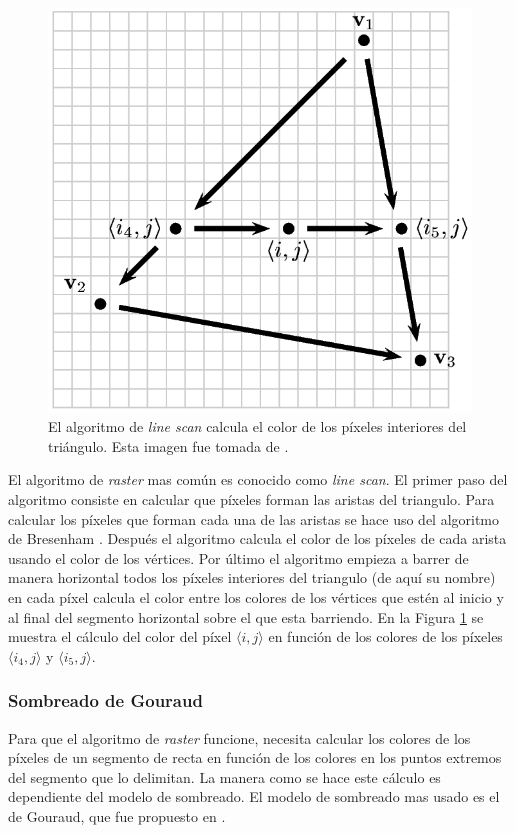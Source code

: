 \begin{figure}[htp]
 \centering
  \includegraphics[scale=0.4]{img/cap01/lineScan}
  \caption[Ejemplo de sombreado sobre un triangulo]{El algoritmo de \emph{line scan} calcula el color de los píxeles interiores del triángulo. Esta imagen fue tomada de \cite{bussCG}.}
  \label{fig:lineScan}
\end{figure}

El algoritmo de \emph{raster} mas común es conocido como \emph{line scan}. El primer paso del algoritmo consiste en calcular que píxeles forman las aristas del triangulo. Para calcular los píxeles que forman cada una de las aristas se hace uso del algoritmo de Bresenham \cite{bresenhamAlgorithm}. Después el algoritmo calcula el color de los píxeles de cada arista usando el color de los vértices. Por último el algoritmo empieza a barrer de manera horizontal todos los píxeles interiores del triangulo (de aquí su nombre) en cada píxel calcula el color entre los colores de los vértices que estén al inicio y al final del segmento horizontal sobre el que esta barriendo. En la Figura \ref{fig:lineScan} se muestra el cálculo del color del píxel $\langle i, j\rangle$ en función de los colores de los píxeles $\langle i_4, j\rangle$ y $\langle i_5, j\rangle$. 

\subsubsection{Sombreado de Gouraud}
Para que el algoritmo de \emph{raster} funcione, necesita calcular los colores de los píxeles de un segmento de recta en función de los colores en los puntos extremos del segmento que lo delimitan. La manera como se hace este cálculo es dependiente del modelo de sombreado. El modelo de sombreado mas usado es el de Gouraud, que fue propuesto en \cite{gouraudShading}.

